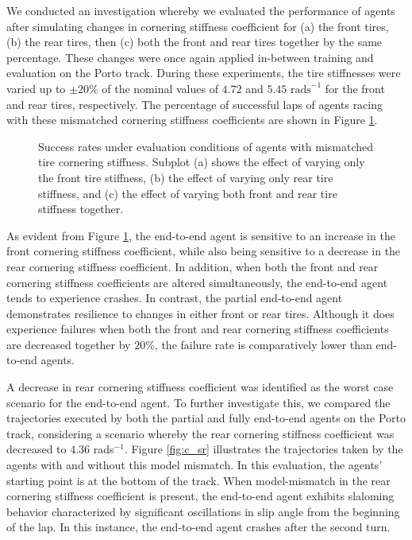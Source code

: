 We conducted an investigation whereby we evaluated the performance of agents after simulating changes in cornering stiffness coefficient for (a) the front tires, (b) the rear tires, then (c) both the front and rear tires together by the same percentage.
These changes were once again applied in-between training and evaluation on the Porto track.
During these experiments, the tire stiffnesses were varied up to $\pm 20 \%$ of the nominal values of $4.72$ and $5.45$ $\text{rads}^{-1}$ for the front and rear tires, respectively.
The percentage of successful laps of agents racing with these mismatched cornering stiffness coefficients are shown in Figure \ref{fig:c_s}.

\begin{figure}[htb!]
    \centering
    
    \caption[Success rate of agents under evaluation conditions with mismatched tire cornering stiffness]{Success rates under evaluation conditions of agents with mismatched tire cornering stiffness. Subplot (a) shows the effect of varying only the front tire stiffness, (b) the effect of varying only rear tire stiffness, and (c) the effect of varying both front and rear tire stiffness together.}
    \label{fig:c_s}
\end{figure}

As evident from Figure \ref{fig:c_s}, the end-to-end agent is sensitive to an increase in the front cornering stiffness coefficient, while also being sensitive to a decrease in the rear cornering stiffness coefficient.
In addition, when both the front and rear cornering stiffness coefficients are altered simultaneously, the end-to-end agent tends to experience crashes. 
In contrast, the partial end-to-end agent demonstrates resilience to changes in either front or rear tires.
Although it does experience failures when both the front and rear cornering stiffness coefficients are decreased together by $20\%$, the failure rate is comparatively lower than end-to-end agents.


A decrease in rear cornering stiffness coefficient was identified as the worst case scenario for the end-to-end agent.
To further investigate this, we compared the trajectories executed by both the partial and fully end-to-end agents on the Porto track, considering a scenario whereby the rear cornering stiffness coefficient was decreased to $4.36$ rads$^{-1}$. 
Figure \ref{fig:c_sr} illustrates the trajectories taken by the agents with and without this model mismatch. 
In this evaluation, the agents' starting point is at the bottom of the track. 
When model-mismatch in the rear cornering stiffness coefficient is present, the end-to-end agent exhibits slaloming behavior characterized by significant oscillations in slip angle from the beginning of the lap.
In this instance, the end-to-end agent crashes after the second turn. 


